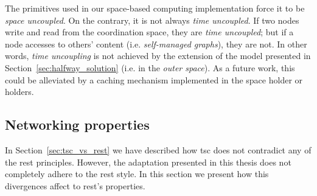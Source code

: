 The primitives used in our space-based computing implementation force it to be \emph{space uncoupled}.
On the contrary, it is not always \emph{time uncoupled}.
If two nodes write and read from the coordination space, they are \emph{time uncoupled};
but if a node accesses to others' content (i.e. \emph{self-managed graphs}), they are not.
In other words, \emph{time uncoupling} is not achieved by the extension of the model presented in Section~\ref{sec:halfway_solution} (i.e. in the \emph{outer space}).
As a future work, this could be alleviated by a caching mechanism implemented in the space holder or holders. %




\subsection{Networking properties} %
\label{sec:network_properties}

In Section~\ref{sec:tsc_vs_rest} we have described how \ac{tsc} does not contradict any of the \ac{rest} principles.
However, the adaptation presented in this thesis does not completely adhere to the \ac{rest} style.
In this section we present how this divergences affect to \ac{rest}'s properties.



